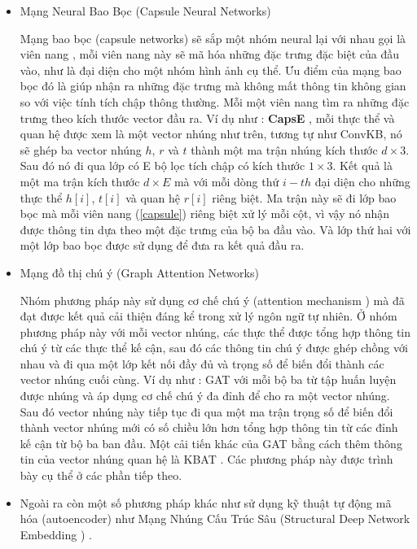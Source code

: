 \begin{itemize}
	\item Mạng Neural Bao Bọc (Capsule Neural Networks)
	
	Mạng bao bọc (capsule networks) sẽ sắp một nhóm neural lại với nhau gọi là viên nang \label{capsule}, mỗi viên nang này sẽ mã hóa những đặc trưng đặc biệt của đầu vào, như là đại diện cho một nhóm hình ảnh cụ thể. Ưu điểm của mạng bao bọc đó là giúp nhận ra những đặc trưng mà không mất thông tin không gian so với việc tính tích chập thông thường. Mỗi một viên nang tìm ra những đặc trưng theo kích thước vector đầu ra. Ví dụ như : \textbf{CapsE} \cite{vu2019capsule}, mỗi thực thể và quan hệ được xem là một vector nhúng như trên, tương tự như ConvKB, nó sẽ ghép ba vector nhúng $h$, $r$ và $t$ thành một ma trận nhúng kích thước $d \times 3$. Sau đó nó đi qua lớp có E bộ lọc tích chập có kích thước $1 \times 3$. Kết quả là một ma trận kích thước $d \times E$ mà với mỗi dòng thứ $i-th$ đại diện cho những thực thể $h[i]$, $t[i]$ và quan hệ $r[i]$ riêng biệt. Ma trận này sẽ đi lớp bao bọc mà mỗi viên nang (\ref{capsule}) riêng biệt xử lý mỗi cột, vì vậy nó nhận được thông tin dựa theo một đặc trưng của bộ ba đầu vào. Và lớp thứ hai với một lớp bao bọc được sử dụng để đưa ra kết quả đầu ra.
	
	\item Mạng đồ thị chú ý (Graph Attention Networks)
	
	Nhóm phương pháp này sử dụng cơ chế chú ý (attention mechanism \cite{vaswani2017attention}) mà đã đạt được kết quả cải thiện đáng kể trong xử lý ngôn ngữ tự nhiên. Ở nhóm phương pháp này với mỗi vector nhúng, các thực thể được tổng hợp thông tin chú ý từ các thực thể kế cận, sau đó các thông tin chú ý được ghép chồng với nhau và đi qua một lớp kết nối đầy đủ và trọng số để biến đổi thành các vector nhúng cuối cùng. Ví dụ như : GAT \cite{velivckovic2017graph} với mỗi bộ ba từ tập huấn luyện được nhúng và áp dụng cơ chế chú ý đa đỉnh để cho ra một vector nhúng. Sau đó vector nhúng này tiếp tục đi qua một ma trận trọng số để biến đổi thành vector nhúng mới có số chiều lớn hơn tổng hợp thông tin từ các đỉnh kế cận từ bộ ba ban đầu. Một cải tiến khác của GAT bằng cách thêm thông tin của vector nhúng quan hệ là KBAT \cite{nathani2019learning}. Các phương pháp này được trình bày cụ thể ở các phần tiếp theo.
	
	\item Ngoài ra còn một số phương pháp khác như sử dụng kỹ thuật tự động mã hóa (autoencoder) như Mạng Nhúng Cấu Trúc Sâu (Structural Deep Network Embedding \cite{wang2016structural}) .
\end{itemize}

